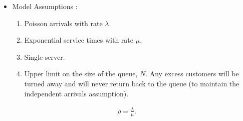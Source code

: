 \documentclass[11pt]{article}
\providecommand{\tightlist}{%
      \setlength{\itemsep}{0pt}\setlength{\parskip}{0pt}}
\begin{document}
\begin{itemize}
\tightlist
\item
  Model Assumptions :

  \begin{enumerate}
  \def\labelenumi{\arabic{enumi}.}
  \tightlist
  \item
    Poisson arrivals with rate \(\lambda\).
  \item
    Exponential service times with rate \(\mu\).
  \item
    Single server.
  \item
    Upper limit on the size of the queue, \(N\). Any excess customers
    will be turned away and will never return back to the queue (to
    maintain the independent arrivals assumption).
  \end{enumerate}
\end{itemize}

 \begin{align}
\rho = \frac{\lambda}{\mu}.
\end{align}
\end{document}
